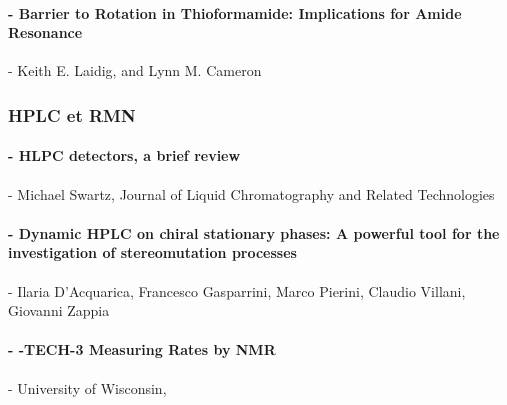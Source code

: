 \documentclass{article}
\begin{document}
\paragraph{- \quad Barrier to Rotation in Thioformamide: Implications for Amide Resonance} - Keith E. Laidig, and Lynn M. Cameron

\subsubsection*{HPLC et RMN}

\paragraph{- \quad HLPC detectors, a brief review} - Michael Swartz, Journal of Liquid Chromatography and Related Technologies

\paragraph{- \quad Dynamic HPLC on chiral stationary phases:
A powerful tool for the investigation of
stereomutation processes} - Ilaria D’Acquarica, Francesco Gasparrini, Marco Pierini, Claudio Villani, Giovanni Zappia

\paragraph{- -TECH-3 Measuring Rates by NMR} - University of Wisconsin, \par [https://www.chem.wisc.edu/areas/reich/nmr/08-tech-03-dnmr.htm]
\end{document}
